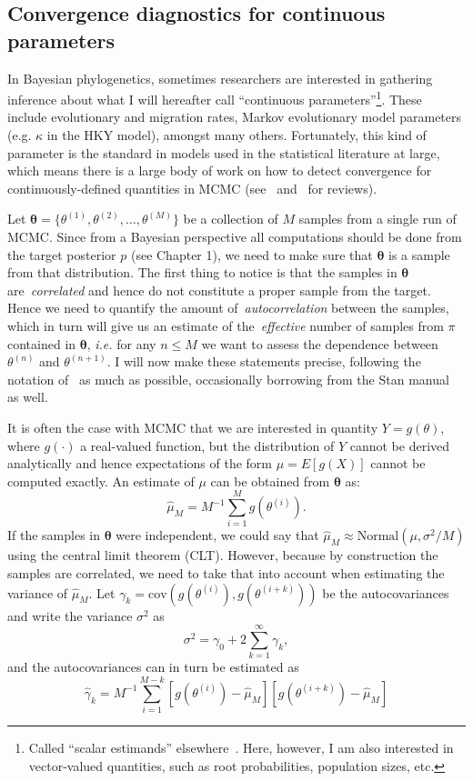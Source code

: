 \subsection{Convergence diagnostics for continuous parameters}
\label{sec:continuous}

In Bayesian phylogenetics, sometimes researchers are interested in gathering inference about what I will hereafter call ``continuous parameters''\footnote{Called ``scalar estimands'' elsewhere~\citep{Gelman2014b}. Here, however, I am also interested in vector-valued quantities, such as root probabilities, population sizes,  etc.}.
These include evolutionary and migration rates, Markov evolutionary model parameters (e.g. $\kappa$ in the HKY model), amongst many others.
Fortunately, this kind of parameter is the standard in models used in the statistical literature at large, which means there is a large body of work on how to detect convergence for continuously-defined quantities in MCMC (see~\cite{Cowles1996} and~\cite{Mengersen1999} for reviews).

Let $\boldsymbol\theta = \{\theta^{(1)}, \theta^{(2)}, \ldots, \theta^{(M)}\}$ be a collection of $M$ samples from a single run of MCMC.
Since from a Bayesian perspective all computations should be done from the target posterior $p$ (see Chapter 1), we need to make sure that $\boldsymbol\theta$ is a sample from that distribution.
The first thing to notice is that the samples in $\boldsymbol\theta$ are~\textit{correlated} and hence do not constitute a proper sample from the target.
Hence we need to quantify the amount of~\textit{autocorrelation} between the samples, which in turn will give us an estimate of the~\textit{effective} number of samples from $\pi$ contained in $\boldsymbol\theta$, \textit{i.e.} for any $n \leq M$ we want to assess the dependence between $\theta^{(n)}$ and $\theta^{(n + 1)}$.
I will now make these statements precise, following the notation of~\cite{Geyer2011} as much as possible, occasionally borrowing from the Stan manual~\citep{StanTeam2017} as well.

It is often the case with MCMC that we are interested in quantity $Y = g(\theta)$, where $g(\cdot)$ a real-valued function, but the distribution of $Y$ cannot be derived analytically and hence expectations of the form $\mu = E[g(X)]$ cannot be computed exactly. 
An estimate of $\mu$ can be obtained from $\boldsymbol\theta$ as:
\[ \hat{\mu}_M = M^{-1}\sum_{i = 1}^M g(\theta^{(i)}). \]
If the samples in $\boldsymbol\theta$ were independent, we could say that $\hat{\mu}_M \approx \text{Normal} (\mu, \sigma^2/M)$ using the central limit theorem (CLT).
However, because by construction the samples are correlated, we need to take that into account when estimating the variance of $\hat{\mu}_M$.
Let $\gamma_k = \text{cov}(g(\theta^{(i)}), g(\theta^{(i + k)}))$ be the autocovariances and write the variance $\sigma^2$ as 
\[ \sigma^2 =  \gamma_0 + 2\sum_{k=1}^\infty \gamma_k,\]
and the autocovariances can in turn be estimated as 
\begin{equation}
\label{eq:autocovs}
 \hat{\gamma}_k = M^{-1}\sum_{i = 1}^{M-k}[g(\theta^{(i)}) - \hat{\mu}_M][g(\theta^{(i + k )}) - \hat{\mu}_M]
\end{equation}

